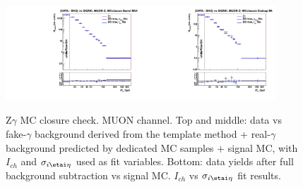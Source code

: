 \begin{figure}[htb]
\begin{center}
\includegraphics[width=0.45\textwidth]{../figs/figs_v11/MUON_ZGamma/PrepareYields/c_BkgSubtrDATAvsSIGMC_c_MUON_ZGamma__UNblind_MCclosure__Barrel__phoEt_MCclosure.pdf}\includegraphics[width=0.45\textwidth]{../figs/figs_v11/MUON_ZGamma/PrepareYields/c_BkgSubtrDATAvsSIGMC_c_MUON_ZGamma__UNblind_MCclosure__Endcap__phoEt_MCclosure.pdf}\\
  \caption{Z$\gamma$ MC closure check. MUON channel. Top and middle: data vs fake-$\gamma$ background derived from the template method + real-$\gamma$ background predicted by dedicated MC samples + signal MC, with $I_{ch}$ and $\sigma_{i\etai\eta}$ used as fit variables. Bottom: data yields after full background subtraction vs signal MC. $I_{ch}$ vs $\sigma_{i\etai\eta}$ fit results. }
  \label{fig:DDvsMC_Zg_MCclosure_MUON}
  \end{center}
\end{figure}

